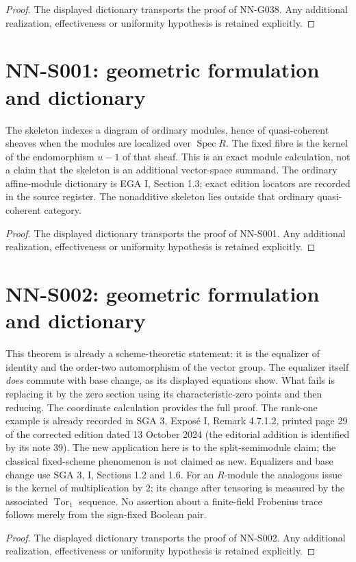 \begin{proof} The displayed dictionary transports the proof of NN-G038. Any additional realization, effectiveness or uniformity hypothesis is retained explicitly.\end{proof}


\section{NN-S001: geometric formulation and dictionary}
\begin{geometricstatement}[NN-S001]
The skeleton indexes a diagram of ordinary modules, hence of
quasi-coherent sheaves when the modules are localized over $\operatorname{Spec}R$.
The fixed fibre is the kernel of the endomorphism $u-1$ of that sheaf.
This is an exact module calculation, not a claim that the skeleton is
an additional vector-space summand. The ordinary affine-module
dictionary is EGA I, Section 1.3; exact edition locators are recorded
in the source register. The nonadditive skeleton lies outside that
ordinary quasi-coherent category.
\end{geometricstatement}
\begin{proof} The displayed dictionary transports the proof of NN-S001. Any additional realization, effectiveness or uniformity hypothesis is retained explicitly.\end{proof}


\section{NN-S002: geometric formulation and dictionary}
\begin{geometricstatement}[NN-S002]
This theorem is already a scheme-theoretic statement: it is the
equalizer of identity and the order-two automorphism of the vector
group. The equalizer itself \emph{does} commute with base change,
as its displayed equations show. What fails is replacing it by the
zero section using its characteristic-zero points and then reducing.
The coordinate calculation provides the full proof. The rank-one
example is already recorded in SGA 3, Expos\'e I, Remark 4.7.1.2,
printed page 29 of the corrected edition dated 13 October 2024
(the editorial addition is identified by its note 39). The new
application here is to the split-semimodule claim; the classical
fixed-scheme phenomenon is not claimed as new. Equalizers and base
change use SGA 3, I, Sections 1.2 and 1.6.
For an $R$-module the analogous issue is the kernel of multiplication
by $2$; its change after tensoring is measured by the associated
$\operatorname{Tor}_1$ sequence. No assertion about a finite-field
Frobenius trace follows merely from the sign-fixed Boolean pair.
\end{geometricstatement}
\begin{proof} The displayed dictionary transports the proof of NN-S002. Any additional realization, effectiveness or uniformity hypothesis is retained explicitly.\end{proof}


